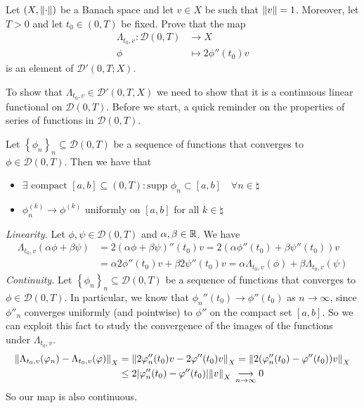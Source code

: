 \newpage
\begin{exercise}
    Let \((X, \norm{\cdot})\) be a Banach space and let \(v \in X\) be such that \(\norm{v} = 1\). Moreover, let \(T > 0\) and let \(t_0 \in (0, T)\) be fixed. Prove that the map
    \begin{align*}
        \Lambda_{t_0, v}: \mathcal{D}(0, T) &\longrightarrow X \\
        \phi &\longmapsto 2 \phi''(t_0) v
    \end{align*}
    is an element of \(\mathcal{D}'(0, T; X)\).
\end{exercise}
To show that \(\Lambda_{t_0, v} \in \mathcal{D}'(0, T, X)\) we need to show that it is a continuous linear functional on \(\mathcal{D}(0, T)\). 
Before we start, a quick reminder on the properties of series of functions in \(\mathcal{D}(0, T)\).
\begin{remark}
    Let \(\left\{ \phi_n \right\}_{n} \subseteq \mathcal{D}(0, T)\) be a sequence of functions that converges to \(\phi \in \mathcal{D}(0, T)\). Then we have that
    \begin{itemize}
        \item \(\exists \text{ compact }[a, b] \subseteq (0, T) \colon \text{supp } \phi_n \subset [a, b] \quad \forall n \in \natural\)
        \item \(\phi_n^{(k)} \to \phi^{(k)}\) uniformly on \([a, b]\) for all \(k \in \natural\)
    \end{itemize}
\end{remark}
\textit{Linearity.} 
Let \(\phi, \psi \in \mathcal{D}(0, T)\) and \(\alpha, \beta \in \mathbb{R}\). We have
\[
    \begin{split}
        \Lambda_{t_0, v}(\alpha \phi + \beta \psi) &= 2 (\alpha \phi + \beta \psi)''(t_0) v = 2 (\alpha \phi''(t_0) + \beta \psi''(t_0)) v \\
                                                   &= \alpha 2 \phi''(t_0) v + \beta 2 \psi''(t_0) v = \alpha \Lambda_{t_0, v}(\phi) + \beta \Lambda_{t_0, v}(\psi)
    \end{split}
\]
\textit{Continuity.}
Let \(\left\{\phi_n\right\}_n \subseteq \mathcal{D}(0, T)\) be a sequence of functions that converges to \(\phi \in \mathcal{D}(0, T)\). 
In particular, we know that \(\phi_n''(t_0) \to \phi''(t_0)\) as \(n \to \infty\), since \(\phi''_n\) converges uniformly (and pointwise) to \(\phi''\) on the compact set \([a, b]\).
So we can exploit this fact to study the convergence of the images of the functions under \(\Lambda_{t_0, v}\).
\[
    \begin{split}
        \norm{\Lambda_{t_0, v}(\varphi_n) - \Lambda_{t_0, v}(\varphi)}_X & = \norm{2 \varphi_n''(t_0) v - 2 \varphi''(t_0) v}_X = \norm{2 (\varphi_n''(t_0) - \varphi''(t_0)) v}_X \\
        & \leq 2 \abs{\varphi_n''(t_0) - \varphi''(t_0)} \norm{v}_X\, \underset{n \to \infty}{\longrightarrow} 0
    \end{split} 
\]
So our map is also continuous.